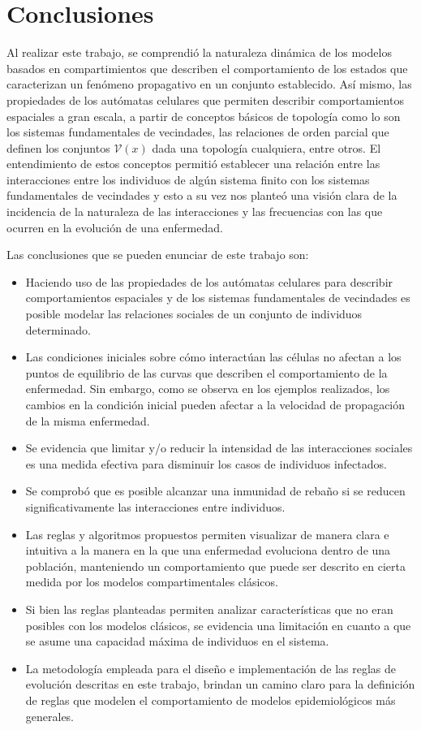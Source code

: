 \chapter{Conclusiones}

Al realizar este trabajo, se comprendió la naturaleza dinámica de los modelos basados en compartimientos que describen el comportamiento de los estados que caracterizan un fenómeno propagativo en un conjunto establecido. Así mismo, las propiedades de los autómatas celulares que permiten describir comportamientos espaciales a gran escala, a partir de conceptos básicos de topología como lo son los sistemas fundamentales de vecindades, las relaciones de orden parcial que definen los conjuntos $\mathcal{V}(x)$ dada una topología cualquiera, entre otros. El entendimiento de estos conceptos permitió establecer una relación entre las interacciones entre los individuos de algún sistema finito con los sistemas fundamentales de vecindades y esto a su vez nos planteó una visión clara de la incidencia de la naturaleza de las interacciones y las frecuencias con las que ocurren
en la evolución de una enfermedad.

Las conclusiones que se pueden enunciar de este trabajo son:
\begin{itemize}
    \item Haciendo uso de las propiedades de los autómatas celulares para describir comportamientos espaciales y de los sistemas fundamentales de vecindades es posible modelar las relaciones sociales de un conjunto de individuos determinado.
    \item Las condiciones iniciales sobre cómo interactúan las células no afectan a los puntos de equilibrio de las curvas que describen el comportamiento de la enfermedad. Sin embargo, como se observa en los ejemplos realizados, los cambios en la condición inicial pueden afectar a la velocidad de propagación de la misma enfermedad.
    \item Se evidencia que limitar y/o reducir la intensidad de las interacciones sociales es una medida efectiva para disminuir los casos de individuos infectados.
    \item Se comprobó que es posible alcanzar una inmunidad de rebaño si se reducen significativamente las interacciones entre individuos.
    \item Las reglas y algoritmos propuestos permiten visualizar de manera clara e intuitiva a la manera en la que una enfermedad evoluciona dentro de una población, manteniendo un comportamiento que puede ser descrito en cierta medida por los modelos compartimentales clásicos.
    \item Si bien las reglas planteadas permiten analizar características que no eran posibles con los modelos clásicos, se evidencia una limitación en cuanto a que se asume una capacidad máxima de individuos en el sistema.
    \item La metodología empleada para el diseño e implementación de las reglas de evolución descritas en este trabajo, brindan un camino claro para la definición de reglas que modelen el comportamiento de modelos epidemiológicos más generales.
\end{itemize}